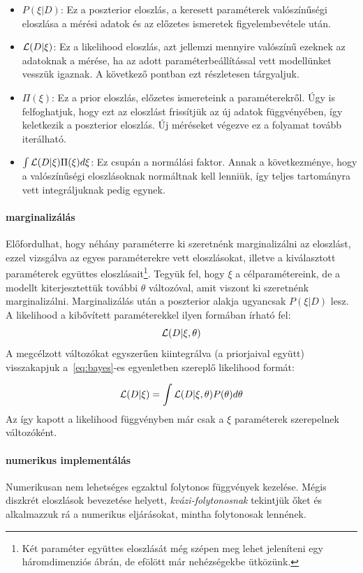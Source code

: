 \begin{itemize}
	\item $P(\xi|D)$: Ez a poszterior eloszlás, a keresett paraméterek valószínűségi eloszlása a mérési adatok és az előzetes ismeretek figyelembevétele után.
	\item $\mathcal{L}(D|\xi)$: Ez a likelihood eloszlás, azt jellemzi mennyire valószínű ezeknek az adatoknak a mérése, ha az adott paraméterbeállítással vett modellünket vesszük igaznak. A következő pontban ezt részletesen tárgyaljuk.
	\item $\Pi(\xi)$: Ez a prior eloszlás, előzetes ismereteink a paraméterekről. Úgy is felfoghatjuk, hogy ezt az eloszlást frissítjük az új adatok függvényében, így keletkezik a poszterior eloszlás. Új méréseket végezve ez a folyamat tovább iterálható.
	\item $\int \mathcal{L}(D|\xi)\Pi(\xi)d\xi$: Ez csupán a normálási faktor. Annak a következménye, hogy a valószínűségi eloszlásoknak normáltnak kell lenniük, így teljes tartományra vett integráljuknak pedig egynek.
\end{itemize}

\paragraph{marginalizálás}
Előfordulhat, hogy néhány paraméterre ki szeretnénk marginalizálni az eloszlást, ezzel vizsgálva az egyes paraméterekre vett eloszlásokat, illetve a kiválasztott paraméterek együttes eloszlásait\footnote{Két paraméter együttes eloszlását még szépen meg lehet jeleníteni egy háromdimenziós ábrán, de efölött már nehézségekbe ütközünk.}. Tegyük fel, hogy $\xi$ a célparamétereink, de a modellt kiterjesztettük további $\theta$ változóval, amit viszont ki szeretnénk marginalizálni. Marginalizálás után a poszterior alakja ugyancsak $P(\xi|D)$ lesz.  A likelihood a kibővített paraméterekkel ilyen formában írható fel:
\[
\mathcal{L}(D|\xi, \theta)
\]
A megcélzott változókat egyszerűen kiintegrálva (a priorjaival együtt) visszakapjuk a~\ref{eq:bayes}-es egyenletben szereplő likelihood formát:

\begin{eqnarray}\label{eq:marginalize}
\mathcal{L}(D|\xi) = \int \mathcal{L}(D|\xi, \theta)P(\theta)d\theta
\end{eqnarray}
Az így kapott a likelihood függvényben már csak a $\xi$ paraméterek szerepelnek változóként.

\paragraph{numerikus implementálás}
Numerikusan nem lehetséges egzaktul folytonos függvények kezelése. Mégis diszkrét eloszlások bevezetése helyett, \textit{kvázi-folytonosnak} tekintjük őket és alkalmazzuk rá a numerikus eljárásokat, mintha folytonosak lennének.




